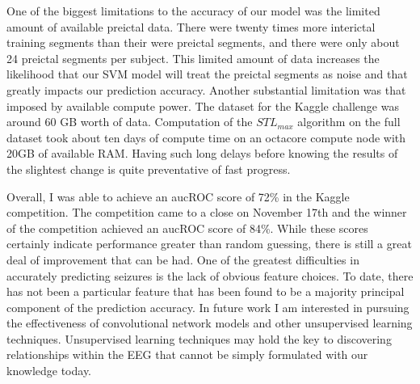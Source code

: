 One of the biggest limitations to the accuracy of our model was the limited amount of available preictal data.  There were twenty times more interictal training segments than their were preictal segments, and there were only about 24 preictal segments per subject.  This limited amount of data increases the likelihood that our SVM model will treat the preictal segments as noise and that greatly impacts our prediction accuracy.  Another substantial limitation was that imposed by available compute power.  The dataset for the Kaggle challenge was around 60 GB worth of data. Computation of the $STL_{max}$ algorithm on the full dataset took about ten days of compute time on an octacore compute node with 20GB of available RAM.  Having such long delays before knowing the results of the slightest change is quite preventative of fast progress.

Overall, I was able to achieve an aucROC score of 72\% in the Kaggle competition.  The competition came to a close on November 17th and the winner of the competition achieved an aucROC score of 84\%.  While these scores certainly indicate performance greater than random guessing, there is still a great deal of improvement that can be had.  One of the greatest difficulties in accurately predicting seizures is the lack of obvious feature choices.  To date, there has not been a particular feature that has been found to be a majority principal component of the prediction accuracy.  In future work I am interested in pursuing the effectiveness of convolutional network models and other unsupervised learning techniques.  Unsupervised learning techniques may hold the key to discovering relationships within the EEG that cannot be simply formulated with our knowledge today.
